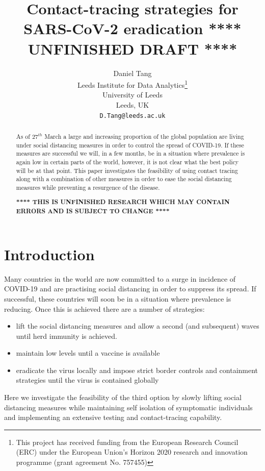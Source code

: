 \documentclass{article}
\title{Contact-tracing strategies for SARS-CoV-2 eradication
\textbf{**** UNFINISHED DRAFT ****}
}
\author{
  Daniel Tang\\
  Leeds Institute for Data Analytics\thanks{This project has received funding from the European Research Council (ERC) under the European Union’s Horizon 2020 research and innovation programme (grant agreement No. 757455)}\\
  University of Leeds\\
  Leeds, UK\\
  \texttt{D.Tang@leeds.ac.uk} \\
}
\begin{document}
\maketitle

\begin{abstract}
As of $27^{th}$ March a large and increasing proportion of the global population are living under social distancing measures in order to control the spread of COVID-19. If these measures are successful we will, in a few months, be in a situation where prevalence is again low in certain parts of the world, however, it is not clear what the best policy will be at that point. This paper investigates the feasibility of using contact tracing along with a combination of other measures in order to ease the social distancing measures while preventing a resurgence of the disease.

\textbf{**** THIS IS UNFINISHED RESEARCH WHICH MAY CONTAIN ERRORS AND IS SUBJECT TO CHANGE ****}
\end{abstract}


\section{Introduction}

Many countries in the world are now committed to a surge in incidence of COVID-19 and are practising social distancing in order to suppress its spread. If successful, these countries will soon be in a situation where prevalence is reducing. Once this is achieved there are a number of strategies:
\begin{itemize}

\item lift the social distancing measures and allow a second (and subsequent) waves until herd immunity is achieved\cite{ferguson2020impact}.

\item maintain low levels until a vaccine is available

\item eradicate the virus locally and impose strict border controls and containment strategies until the virus is contained globally
\end{itemize}

Here we investigate the feasibility of the third option by slowly lifting social distancing measures while maintaining self isolation of symptomatic individuals and implementing an extensive testing and contact-tracing capability.
\end{document}
